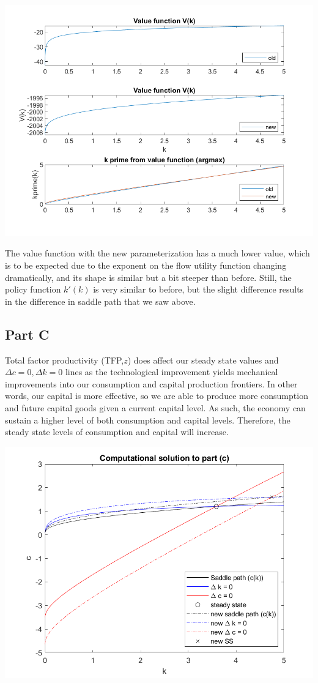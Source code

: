 \documentclass[11pt]{article} %
\begin{document}
\includegraphics{partB2}

The value function with the new parameterization has a much lower value, which is to be expected due to the exponent on the flow utility function changing dramatically, and its shape is similar but a bit steeper than before. Still, the policy function $k'(k)$ is very similar to before, but the slight difference results in the difference in saddle path that we saw above.

\subsection{Part C}

Total factor productivity (TFP,$z$) does affect our steady state values and $\Delta c = 0,\Delta k = 0$ lines as the technological improvement yields mechanical improvements into our consumption and capital production frontiers. In other words, our capital is more effective, so we are able to produce more consumption and future capital goods given a current capital level. As such, the economy can sustain a higher level of both consumption and capital levels. Therefore, the steady state levels of consumption and capital will increase.

\includegraphics{partC}
\end{document}
